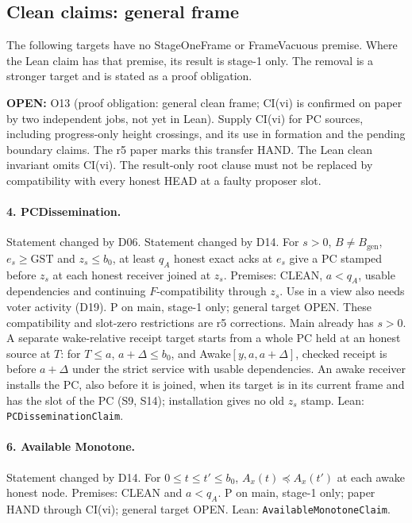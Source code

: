 \documentclass{article}
\newcommand{\genesis}{B_{\mathrm{gen}}}
\newcommand{\OPEN}[1]{\par\noindent\textbf{OPEN:} #1\par}
\newcommand{\nm}[1]{\nolinkurl{#1}}
\begin{document}
\subsection{Clean claims: general frame}

The following targets have no StageOneFrame or FrameVacuous premise.
Where the Lean claim has that premise, its result is stage-1 only.
The removal is a stronger target and is stated as a proof obligation.

\OPEN{O13 (proof obligation: general clean frame; CI(vi) is confirmed on paper
by two independent jobs, not yet in Lean). Supply CI(vi) for PC sources, including
progress-only height crossings, and its use in formation and the pending
boundary claims. The r5 paper marks this transfer HAND. The Lean clean
invariant omits CI(vi). The result-only root clause must not be replaced
by compatibility with every honest HEAD at a faulty proposer slot.}

\paragraph{4. PCDissemination.}
Statement changed by D06. Statement changed by D14.
For $s>0$, $B\ne\genesis$, $e_s\geq\mathrm{GST}$ and $z_s\leq b_0$, at least $q_A$ honest exact acks at $e_s$ give a PC stamped before $z_s$ at each honest receiver joined at $z_s$. Premises: CLEAN, $a<q_A$, usable dependencies and continuing $F$-compatibility through $z_s$. Use in a view also needs voter activity (D19). P on main, stage-1 only; general target OPEN. These compatibility and slot-zero restrictions are r5 corrections. Main already has $s>0$. A separate wake-relative receipt target starts from a whole PC held at an honest source at $T$: for $T\leq a$, $a+\Delta\leq b_0$, and Awake$[y,a,a+\Delta]$, checked receipt is before $a+\Delta$ under the strict service with usable dependencies. An awake receiver installs the PC, also before it is joined, when its target is in its current frame and has the slot of the PC (S9, S14); installation gives no old $z_s$ stamp.
Lean: \nm{PCDisseminationClaim}.

\paragraph{6. Available Monotone.}
Statement changed by D14.
For $0\leq t\leq t'\leq b_0$, $A_x(t)\preceq A_x(t')$ at each awake honest node. Premises: CLEAN and $a<q_A$. P on main, stage-1 only; paper HAND through CI(vi); general target OPEN.
Lean: \nm{AvailableMonotoneClaim}.
\end{document}

